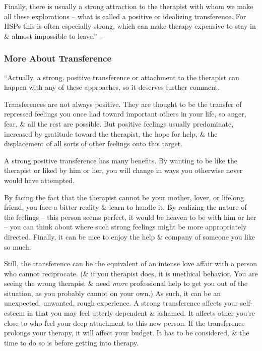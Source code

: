 \documentclass{article}
\numberwithin{equation}{section}
\begin{document}
Finally, there is usually a strong attraction to the therapist with whom we make all these explorations -- what is called a positive or idealizing transference. For HSPs this is often especially strong, which can make therapy expensive to stay in \& almost impossible to leave.'' -- \cite[p. 209]{Aron2013}

\subsubsection{More About Transference}
``Actually, a strong, positive transference or attachment to the therapist can happen with any of these approaches, so it deserves further comment.

Transferences are not always positive. They are thought to be the transfer of repressed feelings you once had toward important others in your life, so anger, fear, \& all the rest are possible. But positive feelings usually predominate, increased by gratitude toward the therapist, the hope for help, \& the displacement of all sorts of other feelings onto this target.

A strong positive transference has many benefits. By wanting to be like the therapist or liked by him or her, you will change in ways you otherwise never would have attempted.

By facing the fact that the therapist cannot be your mother, lover, or lifelong friend, you face a bitter reality \& learn to handle it. By realizing the nature of the feelings -- this person seems perfect, it would be heaven to be with him or her -- you can think about where such strong feelings might be more appropriately directed. Finally, it can be nice to enjoy the help \& company of someone you like so much.

Still, the transference can be the equivalent of an intense love affair with a person who cannot reciprocate. (\& if you therapist does, it is unethical behavior. You are seeing the wrong therapist \& need \textit{more} professional help to get you out of the situation, as you probably cannot on your own.) As such, it can be an unexpected, unwanted, rough experience. A strong transference affects your self-esteem in that you may feel utterly dependent \& ashamed. It affects other you're close to who feel your deep attachment to this new person. If the transference prolongs your therapy, it will affect your budget. It has to be considered, \& the time to do so is before getting into therapy.
\end{document}
